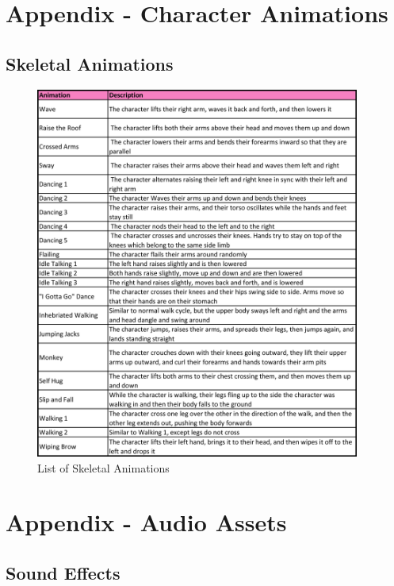 \appendix
\chapter{Appendix - Character Animations}

\clearpage
\section{Skeletal Animations}

\begin{figure}[H]
\centering
  \caption{List of Skeletal Animations}
  \label{fig:animations_list}
  \includegraphics[width=0.95\textwidth, height=0.7\paperheight, keepaspectratio=true]{images/table_animations}
\end{figure}

\chapter{Appendix - Audio Assets}
\section{Sound Effects}

